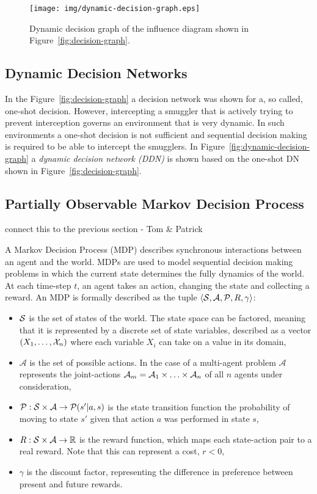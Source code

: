 \documentclass[conference]{IEEEtran}
\begin{document}
\begin{figure}[!t]
\begin{center}
 \texttt{[image: img/dynamic-decision-graph.eps]}
 \caption{Dynamic decision graph of the influence diagram shown in Figure~\ref{fig:decision-graph}.}\label{fig:ddn} 
\end{center}
\end{figure}


\subsection{Dynamic Decision Networks}

In the Figure~\ref{fig:decision-graph} a decision network was shown for a, so called, one-shot decision. However, intercepting a smuggler that is actively trying to prevent interception governs an environment that is very dynamic. In such environments a one-shot decision is not sufficient and sequential decision making is required to be able to intercept the smugglers. In Figure~\ref{fig:dynamic-decision-graph} a {\em dynamic decision network (DDN)} is shown based on the one-shot DN shown in Figure~\ref{fig:decision-graph}.

\subsection{Partially Observable Markov Decision Process}
{\red connect this to the previous section - Tom \& Patrick}

A Markov Decision Process (MDP) \cite{bellman1957dynamic,mdp} describes synchronous interactions between an agent and the world. MDPs are used to model sequential decision making problems in which the current state determines the fully dynamics of the world. At each time-step $t$, an agent takes an action, changing the state and collecting a reward. An MDP is formally described as the tuple $\langle\S,\mathcal{A},\P,R,\gamma\rangle$:

\begin{itemize}
\item $\S$ is the set of states of the world. The state space can be factored, meaning that it is represented by a discrete set of state variables, described as a vector $\left(X_1,\ldots,\X_n\right)$ where each variable $X_i$ can take on a value in its domain,
\item $\mathcal{A}$ is the set of possible actions. In the case of a multi-agent problem $\mathcal{A}$ represents the joint-actions $\A_{m} = \A_1\times\ldots\times\A_n$ of all $n$ agents under consideration,
\item $\P:\S\times\mathcal{A}\to\P(s'|a,s)$ is the state transition function \ie the probability of moving to state $s'$ given that action $a$ was performed in state $s$,
\item $R:\S\times\mathcal{A}\to\mathbb{R}$ is the reward function, which maps each state-action pair to a real reward. Note that this can represent a cost, \ie $r < 0$,
\item $\gamma$ is the discount factor, representing the difference in preference between present and future rewards.
\end{itemize}
\end{document}
